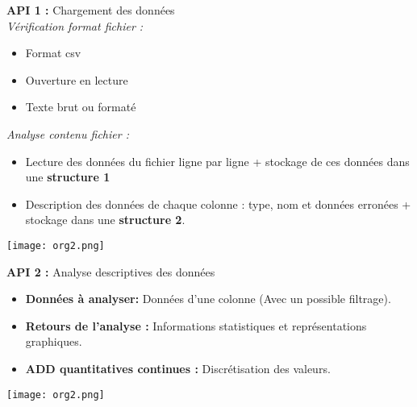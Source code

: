 	\begin{frame}
		\textbf{API 1 :} Chargement des données\\
		\textit{Vérification format fichier :}
		\begin{itemize}
			\item Format csv
			\item Ouverture en lecture
			\item Texte brut ou formaté
		\end{itemize} \pause
		\vspace{1cm}
		\textit{Analyse contenu fichier :}
		\begin{itemize}
			\item Lecture des données du fichier ligne par ligne + stockage de ces données dans une \textbf{structure 1} 
			\item Description des données de chaque colonne : type, nom et données erronées + stockage dans une \textbf{structure 2}.
		\end{itemize}		 		
	\end{frame}
	
	\begin{frame}
		\begin{center}\texttt{[image: org2.png]}\end{center}
	\end{frame}
	
	\begin{frame}
		\textbf{API 2 :} Analyse descriptives des données\\
		\begin{itemize}
			\item \textbf{Données à analyser:} Données d'une colonne (Avec un possible filtrage).
			\item \textbf{Retours de l'analyse :} Informations statistiques et représentations graphiques.
			\item \textbf{ADD quantitatives continues :} Discrétisation des valeurs.
		\end{itemize}	
	\end{frame}
	
	\begin{frame}
		\begin{center}\texttt{[image: org2.png]}\end{center}
	\end{frame}
	
